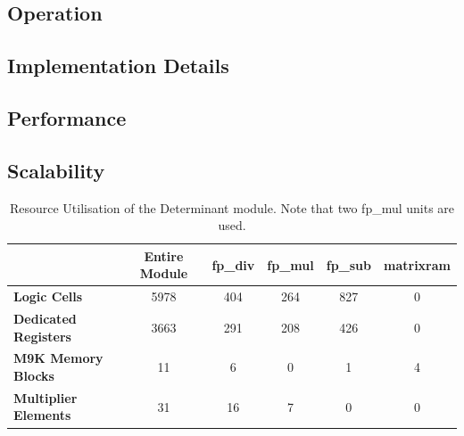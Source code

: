 \documentclass[]{article}
\begin{document}


\subsection{Operation} %
\label{sub:det_operation}




\subsection{Implementation Details} %
\label{sub:implementation_details}




\subsection{Performance} %
\label{sub:performance}




\subsection{Scalability} %
\label{sub:scalability}






\begin{table}[htbp]
	\caption{Resource Utilisation of the Determinant module. Note that two fp\_mul units are used.}
	\label{tab:resource_util_det}
	\begin{center}
		\begin{tabular}{l|ccccc}
		\hline

		\hline
											& \textbf{Entire Module} 	& \textbf{fp\_div} 		& \textbf{fp\_mul}	& \textbf{fp\_sub} 	& \textbf{matrixram} \\
		\hline
			\textbf{Logic Cells} 			& 5978						& 404 					& 264 				& 827 				& 0 \\
		\hline
			\textbf{Dedicated Registers}	& 3663						& 291 					& 208 				& 426				& 0 \\
		\hline
			\textbf{M9K Memory Blocks}		& 11						& 6 					& 0 				& 1 				& 4 \\
		\hline
			\textbf{Multiplier Elements}	& 31						& 16 					& 7 				& 0					& 0 \\
		\hline

		\hline
		\end{tabular}
	\end{center}
\end{table}
\end{document}
